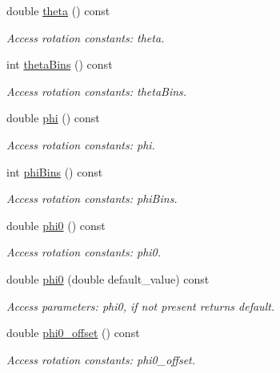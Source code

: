 \begin{DoxyCompactItemize}
double \hyperlink{struct_d_d4hep_1_1_x_m_l_1_1_child_value_ae19135e507ffba981e64987b9a082743}{theta} () const
\begin{DoxyCompactList}\small\item\em Access rotation constants\+: theta. \end{DoxyCompactList}\item 
int \hyperlink{struct_d_d4hep_1_1_x_m_l_1_1_child_value_ace00574a2ca3df185d062d87f5589ac5}{theta\+Bins} () const
\begin{DoxyCompactList}\small\item\em Access rotation constants\+: theta\+Bins. \end{DoxyCompactList}\item 
double \hyperlink{struct_d_d4hep_1_1_x_m_l_1_1_child_value_af9e40776fdff0dcd03f5b07421718049}{phi} () const
\begin{DoxyCompactList}\small\item\em Access rotation constants\+: phi. \end{DoxyCompactList}\item 
int \hyperlink{struct_d_d4hep_1_1_x_m_l_1_1_child_value_a989b00ddee95ed27e402928cd63117fe}{phi\+Bins} () const
\begin{DoxyCompactList}\small\item\em Access rotation constants\+: phi\+Bins. \end{DoxyCompactList}\item 
double \hyperlink{struct_d_d4hep_1_1_x_m_l_1_1_child_value_a412c6734bace421d9d583a5cc6d09a63}{phi0} () const
\begin{DoxyCompactList}\small\item\em Access rotation constants\+: phi0. \end{DoxyCompactList}\item 
double \hyperlink{struct_d_d4hep_1_1_x_m_l_1_1_child_value_ad0b3578457e79bdf4216aa47d62c97c9}{phi0} (double default\+\_\+value) const
\begin{DoxyCompactList}\small\item\em Access parameters\+: phi0, if not present returns default. \end{DoxyCompactList}\item 
double \hyperlink{struct_d_d4hep_1_1_x_m_l_1_1_child_value_aa160dd03560f4b8ec202fda672003e74}{phi0\+\_\+offset} () const
\begin{DoxyCompactList}\small\item\em Access rotation constants\+: phi0\+\_\+offset. \end{DoxyCompactList}\item 

\end{DoxyCompactItemize}
